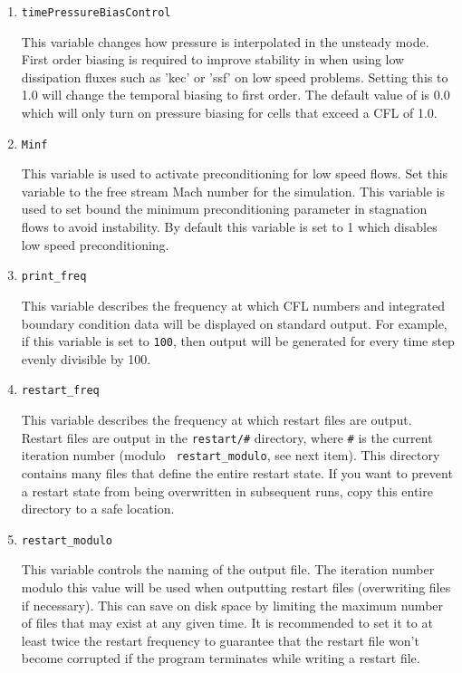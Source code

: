 \documentclass{article}
\begin{document}
\begin{enumerate}
\item {\tt timePressureBiasControl}

This variable changes how pressure is interpolated in the unsteady
mode.  First order biasing is required to improve stability in when
using low dissipation fluxes such as 'kec' or 'ssf' on low speed
problems.  Setting this to 1.0 will change the temporal biasing to
first order.  The default value of is 0.0 which will only turn on
pressure biasing for cells that exceed a CFL of 1.0.

\item {\tt Minf}

  This variable is used to activate preconditioning for low speed
  flows.  Set this variable to the free stream Mach number for the
  simulation.  This variable is used to set bound the minimum
  preconditioning parameter in stagnation flows to avoid instability.
  By default this variable is set to 1 which disables low speed
  preconditioning.
  
\item {\tt print\_freq}

  This variable describes the frequency at which CFL numbers and integrated
  boundary condition data will be displayed on standard output.  For
  example, if this variable is set to {\tt 100}, then output will be
  generated for every time step evenly divisible by 100.
  
\item {\tt restart\_freq} 

  This variable describes the frequency at which restart files are output.
  Restart files are output in the {\tt restart/\#} directory, where
  {\tt \#} is the current iteration number (modulo {\tt
    restart\_modulo}, see next item).  This directory contains many
  files that define the entire restart state.  If you want to prevent a
  restart state from being overwritten in subsequent runs, copy this
  entire directory to a safe location.  

\item {\tt restart\_modulo} 

This variable controls the naming of the output file.  The iteration
number modulo this value will be used when outputting restart files
(overwriting files if necessary).  This can save on disk space by
limiting the maximum number of files that may exist at any given time.
It is recommended to set it to at least twice the restart frequency to
guarantee that the restart file won't become corrupted if the program
terminates while writing a restart file.



\end{enumerate}
\end{document}
